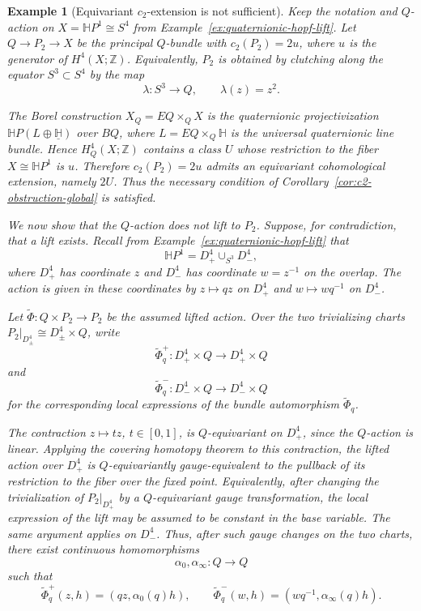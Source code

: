 \documentclass[11pt,a4paper]{article}
\numberwithin{equation}{section}
\newtheorem{example}[definition]{Example}
\theoremstyle{named}
\begin{document}
\begin{example}[Equivariant \(c_2\)-extension is not sufficient]
\label{ex:c2-not-sufficient}
Keep the notation and \(Q\)-action on \(X=\mathbb H P^1\cong S^4\) from
Example~\ref{ex:quaternionic-hopf-lift}. Let \(Q\longrightarrow P_2\longrightarrow X\) be the principal \(Q\)-bundle with \(c_2(P_2)=2u\), where \(u\) is the generator of \(H^4(X;\mathbb Z)\). Equivalently, \(P_2\) is obtained by clutching along the equator \(S^3\subset S^4\) by the map
\[
\lambda:S^3\longrightarrow Q, \qquad \lambda(z)=z^2.
\]

The Borel construction \(X_Q=EQ\times_Q X\) is the quaternionic projectivization \(\mathbb H P(L\oplus\underline{\mathbb H})\) over \(BQ\), where \(L=EQ\times_Q\mathbb H\) is the universal quaternionic line bundle. Hence \(H_Q^4(X;\mathbb Z)\) contains a class \(U\) whose restriction to the fiber \(X\cong\mathbb H P^1\) is \(u\). Therefore \(c_2(P_2)=2u\) admits an equivariant cohomological extension, namely \(2U\). Thus the necessary condition of Corollary~\ref{cor:c2-obstruction-global} is satisfied.

We now show that the \(Q\)-action does not lift to \(P_2\). Suppose, for contradiction, that a lift exists. Recall from Example~\ref{ex:quaternionic-hopf-lift} that 
\[
\mathbb H P^1=D^4_+\cup_{S^3}D^4_-,
\]
where \(D^4_+\) has coordinate \(z\) and \(D^4_-\) has coordinate \(w=z^{-1}\) on the overlap. The action is given in these coordinates by \(z\mapsto qz\) on \(D^4_+\) and \(w\mapsto wq^{-1}\) on \(D^4_-\).

Let \(\widetilde\Phi:Q\times P_2\longrightarrow P_2\) be the assumed lifted action. Over the two trivializing charts \(P_2|_{D^4_\pm}\cong D^4_\pm\times Q\), write
\[
\widetilde\Phi_q^+ : D^4_+\times Q\longrightarrow D^4_+\times Q
\]
and
\[
\widetilde\Phi_q^- : D^4_-\times Q\longrightarrow D^4_-\times Q
\]
for the corresponding local expressions of the bundle automorphism \(\widetilde\Phi_q\).

The contraction \(z\mapsto tz\), \(t\in[0,1]\), is \(Q\)-equivariant on \(D^4_+\), since the \(Q\)-action is linear. Applying the covering homotopy theorem to this contraction, the lifted action over \(D^4_+\) is \(Q\)-equivariantly gauge-equivalent to the pullback of its restriction to the fiber over the fixed point. Equivalently, after changing the trivialization of \(P_2|_{D^4_+}\) by a \(Q\)-equivariant gauge transformation, the local expression of the lift may be assumed to be constant in the base variable. The same argument applies on \(D^4_-\). Thus, after such gauge changes on the two charts, there exist continuous homomorphisms
\[
\alpha_0,\alpha_\infty:Q\longrightarrow Q
\]
such that
\[
\widetilde\Phi_q^+(z,h)=(qz,\alpha_0(q)h), \qquad \widetilde\Phi_q^-(w,h)=(wq^{-1},\alpha_\infty(q)h).
\]


\end{example}
\end{document}
